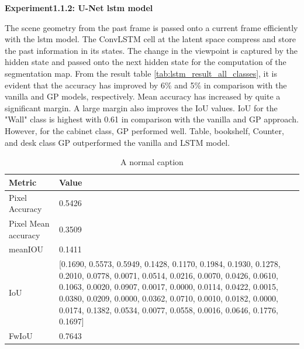     \newpage
	{ \bf Experiment1.1.2: U-Net lstm model}
	
	The scene geometry from the past frame is passed onto a current frame efficiently with the lstm model. The ConvLSTM cell at the latent space compress and store the past information in its states. The change in the viewpoint is captured by the hidden state and passed onto the next hidden state for the computation of the segmentation map. From the result table \ref{tab:lstm_result_all_classes}, it is evident that the accuracy has improved by 6\% and 5\% in comparison with the vanilla and GP models, respectively. Mean accuracy has increased by quite a significant margin. A large margin also improves the IoU values. IoU for the "Wall" class is highest with 0.61 in comparison with the vanilla and GP approach. However, for the cabinet class, GP performed well. Table, bookshelf, Counter, and desk class GP outperformed the vanilla and LSTM model. 
	
	\begin{table}
	\begin{center}
		\begin{tabular}{ | l | p{12cm} |}
			\hline		
			\cellcolor{purple!30}Metric & \cellcolor{purple!30}Value \\ \hline
			Pixel Accuracy & 0.5426 \\ \hline
			Pixel Mean accuracy & 0.3509  \\ \hline
			meanIOU & 0.1411 \\ \hline
			IoU & [0.1690, 0.5573, 0.5949, 0.1428, 0.1170, 0.1984, 0.1930, 0.1278, 0.2010,
			0.0778, 0.0071, 0.0514, 0.0216, 0.0070, 0.0426, 0.0610, 0.1063, 0.0020,
			0.0907, 0.0017, 0.0000, 0.0114, 0.0422, 0.0015, 0.0380, 0.0209, 0.0000,
			0.0362, 0.0710, 0.0010, 0.0182, 0.0000, 0.0174, 0.1382, 0.0534, 0.0077,
			0.0558, 0.0016, 0.0646, 0.1776, 0.1697] \\ \hline
			FwIoU & 0.7643 \\ \hline
			\hline
		\end{tabular}
		\caption{A normal caption}
		\label{tab:caption}
	\end{center}
	\end{table}
	

